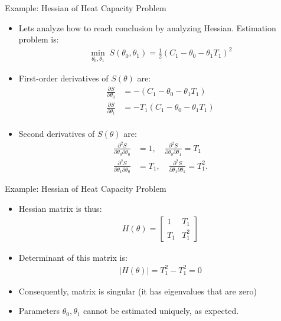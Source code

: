 \documentclass[handout,9pt]{beamer}
\begin{document}
%
\begin{frame}{Example: Hessian of Heat Capacity Problem}

\begin{itemize}
\setlength{\itemsep}{10pt}
\item Lets analyze how to reach conclusion by analyzing Hessian. Estimation problem is:
\begin{align*}
\min_{\theta_0,\theta_1} \; S(\theta_0,\theta_1)=\frac{1}{2}(C_1-\theta_0-\theta_1T_1)^2
\end{align*}
\item First-order derivatives of $S(\theta)$ are:
\begin{align*}
\frac{\partial S}{\partial \theta_0}&=-(C_1-\theta_0-\theta_1 T_1)\\
\frac{\partial S}{\partial \theta_1}&=-T_1(C_1-\theta_0-\theta_1 T_1)\\
\end{align*}
\item Second derivatives of $S(\theta)$ are:
\begin{align*}
\frac{\partial^2 S}{\partial \theta_0 \partial \theta_0}&=1,\quad \frac{\partial^2 S}{\partial \theta_0\partial \theta_1}=T_1\\
\frac{\partial^2 S}{\partial \theta_1 \partial \theta_0}&=T_1,\quad \frac{\partial^2 S}{\partial \theta_1 \partial \theta_1}=T_1^2.
\end{align*}
\end{itemize}

\end{frame}

%
\begin{frame}{Example: Hessian of Heat Capacity Problem}

\begin{itemize}
\setlength{\itemsep}{10pt}
\item Hessian matrix is thus:
\begin{align*}
H(\theta)=\left[\begin{array}{cc}1&T_1\\ T_1 & T_1^2\end{array}\right]
\end{align*}
\item Determinant of this matrix is:
\begin{align*}
|H(\theta)|=T_1^2-T_1^2=0
\end{align*}
\item Consequently, matrix is singular (it has eigenvalues that are zero)
\item Parameters $\theta_0,\theta_1$ cannot be estimated uniquely, as expected. 
\end{itemize}

\end{frame}
\end{document}
